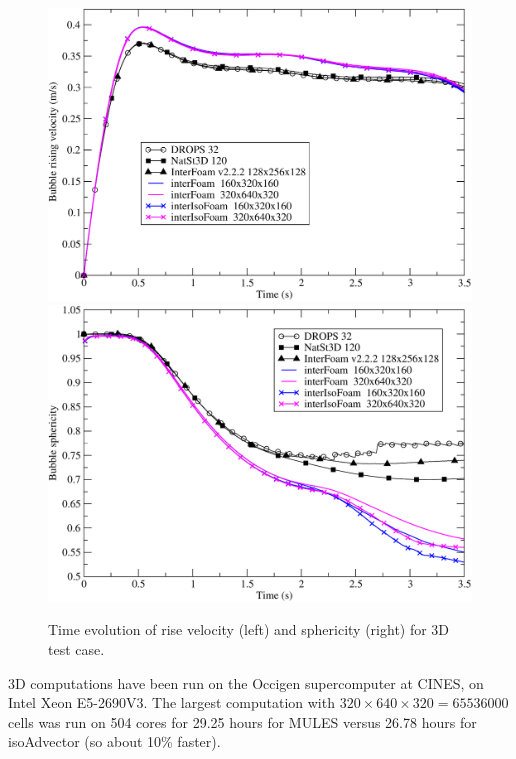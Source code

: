 \documentclass[review]{elsarticle}
\begin{document}
\begin{figure}[!h]
  \centering
  \includegraphics[scale=0.333]{figures/bubble_velocity3D.pdf}
  \hspace{0.8cm}
  \includegraphics[scale=0.333]{figures/bubble_sphericity3D.pdf}
  \caption{Time evolution of rise velocity (left) and sphericity (right) for 3D test case. }
  \label{fig:4}
\end{figure}

3D computations have been run on the Occigen supercomputer at CINES, on Intel 
Xeon E5-2690V3. The largest computation with 
$320 \times 640 \times 320 = 65 536 000$ cells was run on 504 cores for 29.25 hours for
MULES versus 26.78 hours for isoAdvector (so about 10\% faster). 
\end{document}
